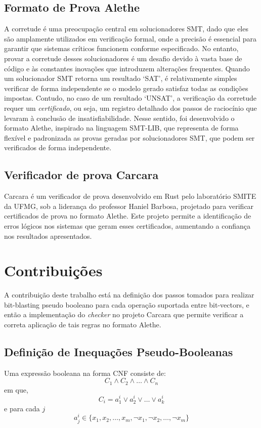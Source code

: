\documentclass[conference]{IEEEtran}
\begin{document}
\subsection{Formato de Prova Alethe}
A corretude é uma preocupação central em solucionadores SMT, dado que eles são amplamente
utilizados em verificação formal, onde a precisão é essencial para garantir que sistemas críticos
funcionem conforme especificado. No entanto, provar a corretude desses solucionadores é um desafio
devido à vasta base de código e às constantes inovações que introduzem alterações frequentes.
Quando um solucionador SMT retorna um resultado `SAT', é relativamente simples verificar de forma
independente se o modelo gerado satisfaz todas as condições impostas. Contudo, no caso de um
resultado `UNSAT', a verificação da corretude requer um \textit{certificado}, ou seja, um registro
detalhado dos passos de raciocínio que levaram à conclusão de insatisfiabilidade.
Nesse sentido, foi desenvolvido o formato Alethe\cite{Alethe}, inspirado na linguagem SMT-LIB, que representa de
forma flexível e padronizada as provas geradas por solucionadores SMT, que podem ser verificados de
forma independente.


\subsection{Verificador de prova Carcara}
Carcara\cite{Carcara} é um verificador de prova desenvolvido em Rust pelo laboratório SMITE da UFMG,
sob a liderança do professor Haniel Barbosa, projetado para verificar certificados de prova no
formato Alethe. Este projeto permite a identificação de erros lógicos nos sistemas que geram
esses certificados, aumentando a confiança nos resultados apresentados.

\section{Contribuições}
A contribuição deste trabalho está na definição dos passos tomados para realizar bit-blasting
pseudo booleano para cada operação suportada entre bit-vectors, e então a implementação do
\textit{checker} no projeto Carcara que permite verificar a correta aplicação de tais regras
no formato Alethe.


\subsection{Definição de Inequações Pseudo-Booleanas}
Uma expressão booleana na forma CNF consiste de:
\begin{equation}
    C_1 \land C_2 \land \dots \land C_n
\end{equation}
em que,
\begin{equation}
    C_i = a_1^i \lor a_2^i \lor \dots \lor a_k^i
\end{equation}
e para cada $j$
\begin{equation}
    a_j^i \in \{ x_1,x_2,\dots,x_m,\neg x_1,\neg x_2,\dots, \neg x_m \}
\end{equation}
\end{document}
